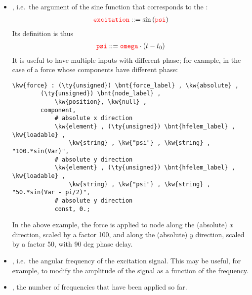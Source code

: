 \begin{itemize}
\item {}, i.e.\ the argument of the sine function that corresponds to the :
\begin{align}
	\textcolor{red}{\texttt{excitation}} ::= \sin\left( \textcolor{red}{\texttt{psi}} \right)
\end{align}
Its definition is thus
\begin{align}
	\textcolor{red}{\texttt{psi}} ::= \textcolor{red}{\texttt{omega}} \cdot (t - t_0)
\end{align}
It is useful to have multiple inputs with different phase; for example, in the case of a force whose components have different phase:
\begin{Verbatim}[commandchars=\\\{\}]
    \kw{force} : (\ty{unsigned}) \bnt{force_label} , \kw{absolute} ,
        (\ty{unsigned}) \bnt{node_label} ,
            \kw{position}, \kw{null} ,
        component,
            # absolute x direction
            \kw{element} , (\ty{unsigned}) \bnt{hfelem_label} , \kw{loadable} ,
                \kw{string} , \kw{"psi"} , \kw{string} , "100.*sin(Var)",
            # absolute y direction
            \kw{element} , (\ty{unsigned}) \bnt{hfelem_label} , \kw{loadable} ,
                \kw{string} , \kw{"psi"} , \kw{string} , "50.*sin(Var - pi/2)",
            # absolute y direction
            const, 0.;
\end{Verbatim}
In the above example, the force is applied to node 
along the (absolute) $x$ direction, scaled by a factor 100, and
along the (absolute) $y$ direction, scaled by a factor 50, with 90 deg phase delay.

\item {}, i.e.\ the angular frequency of the excitation signal.
This may be useful, for example, to modify the amplitude of the signal as a function of the frequency.

\item {}, the number of frequencies that have been applied so far.

\end{itemize}

